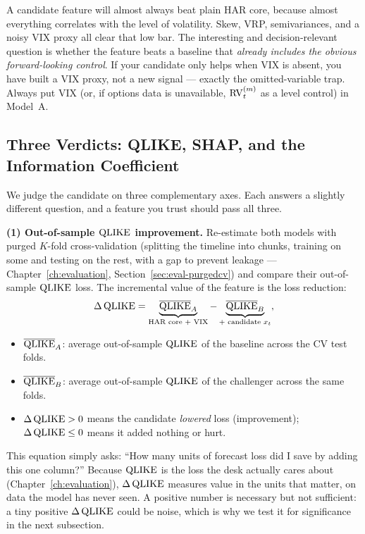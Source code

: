 \begin{warning}
A candidate feature will almost always beat plain HAR core, because almost everything correlates with the level of volatility. Skew, VRP, semivariances, and a noisy VIX proxy all clear that low bar. The interesting and decision-relevant question is whether the feature beats a baseline that \emph{already includes the obvious forward-looking control}. If your candidate only helps when VIX is absent, you have built a VIX proxy, not a new signal --- exactly the omitted-variable trap. Always put VIX (or, if options data is unavailable, $\operatorname{RV}_t^{(m)}$ as a level control) in Model~A.
\end{warning}

\subsection{Three Verdicts: QLIKE, SHAP, and the Information Coefficient}\label{sec:feat-incremental-verdicts}

We judge the candidate on three complementary axes. Each answers a slightly different question, and a feature you trust should pass all three.

\textbf{(1) Out-of-sample $\operatorname{QLIKE}$ improvement.} Re-estimate both models with purged $K$-fold cross-validation (splitting the timeline into chunks, training on some and testing on the rest, with a gap to prevent leakage --- Chapter~\ref{ch:evaluation}, Section~\ref{sec:eval-purgedcv}) and compare their out-of-sample $\operatorname{QLIKE}$ loss. The incremental value of the feature is the loss reduction:
\begin{equation}\label{eq:incremental-qlike}
\Delta \operatorname{QLIKE} = \underbrace{\overline{\operatorname{QLIKE}}_A}_{\text{HAR core + VIX}} - \underbrace{\overline{\operatorname{QLIKE}}_B}_{\text{+ candidate } x_t},
\end{equation}
\begin{itemize}[nosep]
  \item $\overline{\operatorname{QLIKE}}_A$: average out-of-sample $\operatorname{QLIKE}$ of the baseline across the CV test folds.
  \item $\overline{\operatorname{QLIKE}}_B$: average out-of-sample $\operatorname{QLIKE}$ of the challenger across the same folds.
  \item $\Delta \operatorname{QLIKE} > 0$ means the candidate \emph{lowered} loss (improvement); $\Delta \operatorname{QLIKE} \le 0$ means it added nothing or hurt.
\end{itemize}

\begin{intuition}
This equation simply asks: ``How many units of forecast loss did I save by adding this one column?'' Because $\operatorname{QLIKE}$ is the loss the desk actually cares about (Chapter~\ref{ch:evaluation}), $\Delta\operatorname{QLIKE}$ measures value in the units that matter, on data the model has never seen. A positive number is necessary but not sufficient: a tiny positive $\Delta\operatorname{QLIKE}$ could be noise, which is why we test it for significance in the next subsection.
\end{intuition}

